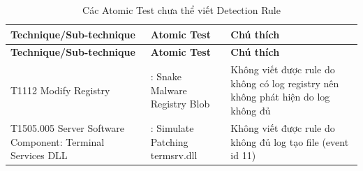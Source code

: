 \begingroup
\small
\renewcommand{\arraystretch}{1.12}
\setlength{\LTpre}{0pt}
\setlength{\LTpost}{0pt}
\begin{longtable}{|>{\raggedright\arraybackslash}p{3.2cm}|>{\raggedright\arraybackslash}p{5.5cm}|>{\raggedright\arraybackslash}p{5.8cm}|}
\caption{Các Atomic Test chưa thể viết Detection Rule}\label{tab:khong-viet-duoc-rule}\\
\hline
\textbf{Technique/Sub-technique} & \textbf{Atomic Test} & \textbf{Chú thích} \\
\hline
\endfirsthead
\hline
\textbf{Technique/Sub-technique} & \textbf{Atomic Test} & \textbf{Chú thích} \\
\hline
\endhead
\hline
\endfoot
\hline
\endlastfoot
T1112 Modify Registry & 57: Snake Malware Registry Blob & Không viết được rule do không có log registry nên không phát hiện do log không đủ \\
\hline
T1505.005 Server Software Component: Terminal Services DLL & 1: Simulate Patching termsrv.dll & Không viết được rule do không đủ log tạo file (event id 11) \\
\hline
\end{longtable}
\endgroup

